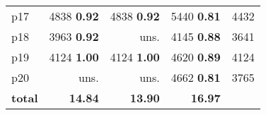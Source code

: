 \begin{tabular}{|l|rrr|r|}
p17 & {\footnotesize 4838} \textbf{0.92} & {\footnotesize 4838} \textbf{0.92} & {\footnotesize 5440} \textbf{0.81} & 4432\\
p18 & {\footnotesize 3963} \textbf{0.92} & uns. & {\footnotesize 4145} \textbf{0.88} & 3641\\
p19 & {\footnotesize 4124} \textbf{1.00} & {\footnotesize 4124} \textbf{1.00} & {\footnotesize 4620} \textbf{0.89} & 4124\\
p20 & uns. & uns. & {\footnotesize 4662} \textbf{0.81} & 3765\\
\hline
\textbf{total} & \textbf{14.84} & \textbf{13.90} & \textbf{16.97} & \\
\hline
\end{tabular}


